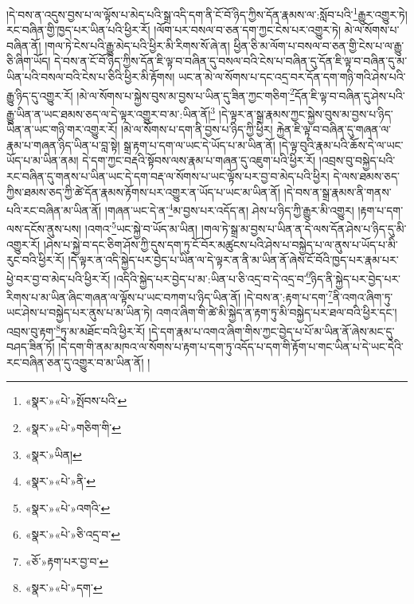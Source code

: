 །དེ་བས་ན་འདུས་བྱས་པ་ལ་ལྟོས་པ་མེད་པའི་སྒྲ་འདི་དག་ནི་ངོ་བོ་ཉིད་ཀྱིས་དོན་རྣམས་ལ་:སློབ་པའི་\footnote{«སྣར་»«པེ་»སྤོབས་པའི་}རྒྱུར་འགྱུར་ཏེ། རང་བཞིན་གྱི་ཁྱད་པར་ཡིན་པའི་ཕྱིར་རོ། །ལོག་པར་བསལ་བ་ཅན་དག་ཀྱང་ངེས་པར་འགྱུར་ཏེ། མེ་ལ་སོགས་པ་བཞིན་ནོ། །གལ་ཏེ་ངེས་པའི་རྒྱུ་མེད་པའི་ཕྱིར་མི་རིགས་སོ་ཞེ་ན། ཕྱིན་ཅི་མ་ལོག་པ་བསལ་བ་ཅན་གྱི་ངེས་པ་ལ་རྒྱུ་ཅི་ཞིག་ཡོད། དེ་བས་ན་ངོ་བོ་ཉིད་ཀྱིས་དོན་ཇི་ལྟ་བ་བཞིན་དུ་བསལ་བའི་ངེས་པ་བཞིན་དུ་དོན་ཇི་ལྟ་བ་བཞིན་དུ་མ་ཡིན་པའི་བསལ་བའི་ངེས་པ་ཅིའི་ཕྱིར་མི་རྟོགས། ཡང་ན་མེ་ལ་སོགས་པ་དང་འདྲ་བར་དོན་དག་གཉི་གའི་ཤེས་པའི་རྒྱུ་ཉིད་དུ་འགྱུར་རོ། །མེ་ལ་སོགས་པ་སྐྱེས་བུས་མ་བྱས་པ་ཡིན་དུ་ཟིན་ཀྱང་གཅིག་\footnote{«སྣར་»«པེ་»གཅིག་གི་}དོན་ཇི་ལྟ་བ་བཞིན་དུ་ཤེས་པའི་རྒྱུ་ཡིན་ན་ཡང་ཐམས་ཅད་ལ་དེ་ལྟར་འགྱུར་བ་མ་:ཡིན་ནོ།\footnote{«སྣར་»ཡིན།} །དེ་ལྟར་ན་སྒྲ་རྣམས་ཀྱང་སྐྱེས་བུས་མ་བྱས་པ་ཉིད་ཡིན་ན་ཡང་གཉི་གར་འགྱུར་རོ། །མེ་ལ་སོགས་པ་དག་ནི་བྱས་པ་ཉིད་ཀྱི་ཕྱིར། རྐྱེན་ཇི་ལྟ་བ་བཞིན་དུ་གཞན་ལ་རྣམ་པ་གཞན་ཉིད་ཡིན་པ་བླ་སྟེ། སྒྲ་རྟག་པ་དག་ལ་ཡང་དེ་ཡོད་པ་མ་ཡིན་ནོ། །དེ་ལྟ་བུའི་རྣམ་པའི་ཆོས་དེ་ལ་ཡང་ཡོད་པ་མ་ཡིན་ནམ། དེ་དག་ཀྱང་བརྡའི་སྟོབས་ལས་རྣམ་པ་གཞན་དུ་འཇུག་པའི་ཕྱིར་རོ། །འབྲས་བུ་བསྐྱེད་པའི་རང་བཞིན་དུ་གནས་པ་ཡིན་ཡང་དེ་དག་བརྡ་ལ་སོགས་པ་ཡང་ལྟོས་པར་བྱ་བ་མེད་པའི་ཕྱིར། དེ་ལས་ཐམས་ཅད་ཀྱིས་ཐམས་ཅད་ཀྱི་ཚེ་དོན་རྣམས་རྟོགས་པར་འགྱུར་ན་ཡོད་པ་ཡང་མ་ཡིན་ནོ། །དེ་བས་ན་སྒྲ་རྣམས་ནི་གནས་པའི་རང་བཞིན་མ་ཡིན་ནོ། །གཞན་ཡང་དེ་ན་\footnote{«སྣར་»«པེ་»ནི་}མ་བྱས་པར་འདོད་ན། ཤེས་པ་ཉིད་ཀྱི་རྒྱུར་མི་འགྱུར། །རྟག་པ་དག་ལས་དངོས་ནུས་པས། །འགའ་\footnote{«སྣར་»«པེ་»འགའི་}ཡང་སྐྱེ་བ་ཡོད་མ་ཡིན། །གལ་ཏེ་སྒྲ་མ་བྱས་པ་ཡིན་ན་དེ་ལས་དོན་ཤེས་པ་ཉིད་དུ་མི་འགྱུར་རོ། །ཤེས་པ་སྐྱེ་བ་དང་ཅིག་ཤོས་ཀྱི་དུས་དག་ཏུ་ངོ་བོར་མཚུངས་པའི་ཤེས་པ་བསྐྱེད་པ་ལ་ནུས་པ་ཡོད་པ་མི་རུང་བའི་ཕྱིར་རོ། །དེ་ལྟར་ན་འདི་སྐྱེད་པར་བྱེད་པ་ཡིན་ལ་དེ་ལྟར་ན་ནི་མ་ཡིན་ནོ་ཞེས་ངོ་བོའི་ཁྱད་པར་རྣམ་པར་ཕྱེ་བར་བྱ་བ་མེད་པའི་ཕྱིར་རོ། །འདིའི་སྐྱེད་པར་བྱེད་པ་མ་:ཡིན་པ་ཅི་འདྲ་བ་དེ་འདྲ་བ་\footnote{«སྣར་»«པེ་»ཅི་འདྲ་བ་}ཉིད་ནི་སྐྱེད་པར་བྱེད་པར་རིགས་པ་མ་ཡིན་ཞིང་གཞན་ལ་ལྟོས་པ་ཡང་བཀག་པ་ཉིད་ཡིན་ནོ། །དེ་བས་ན་:རྟག་པ་དག་\footnote{«ཅོ་»རྟག་པར་བྱ་བ་}ནི་འགའ་ཞིག་ཏུ་ཡང་ཤེས་པ་བསྐྱེད་པར་ནུས་པ་མ་ཡིན་ཏེ། འགའ་ཞིག་གི་ཚེ་མི་སྐྱེད་ན་རྟག་ཏུ་མི་བསྐྱེད་པར་ཐལ་བའི་ཕྱིར་དང་། འབྲས་བུ་རྟག་\footnote{«སྣར་»«པེ་»དག་}ཏུ་མ་མཐོང་བའི་ཕྱིར་རོ། །དེ་དག་རྣམ་པ་འགའ་ཞིག་གིས་ཀྱང་བྱེད་པ་པོ་མ་ཡིན་ནོ་ཞེས་མང་དུ་བཤད་ཟིན་ཏོ། །དེ་དག་གི་ནམ་མཁའ་ལ་སོགས་པ་རྟག་པ་དག་ཏུ་འདོད་པ་དག་གི་རྟོག་པ་གང་ཡིན་པ་དེ་ཡང་དེའི་རང་བཞིན་ཅན་དུ་འགྱུར་བ་མ་ཡིན་ནོ། །
